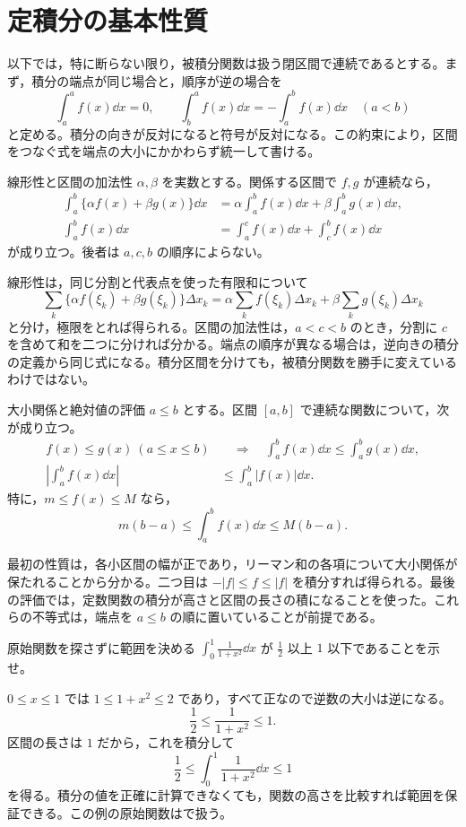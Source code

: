 \section{定積分の基本性質}\label{節:定積分性質}
以下では，特に断らない限り，被積分関数は扱う閉区間で連続であるとする。まず，積分の端点が同じ場合と，順序が逆の場合を
\[
 \int_a^a f(x)\dd x=0,\qquad
 \int_b^a f(x)\dd x=-\int_a^b f(x)\dd x\quad(a<b)
\]
と定める。積分の向きが反対になると符号が反対になる。この約束により，区間をつなぐ式を端点の大小にかかわらず統一して書ける。

\begin{theorem}{線形性と区間の加法性}\label{定理:積分基本性質}
$\alpha,\beta$ を実数とする。関係する区間で $f,g$ が連続なら，
\begin{align*}
 \int_a^b\{\alpha f(x)+\beta g(x)\}\dd x
 &=\alpha\int_a^b f(x)\dd x+\beta\int_a^b g(x)\dd x,\\
 \int_a^b f(x)\dd x
 &=\int_a^c f(x)\dd x+\int_c^b f(x)\dd x
\end{align*}
が成り立つ。後者は $a,c,b$ の順序によらない。
\end{theorem}

線形性は，同じ分割と代表点を使った有限和について
\[
 \sum_k\{\alpha f(\xi_k)+\beta g(\xi_k)\}\Delta x_k
 =\alpha\sum_k f(\xi_k)\Delta x_k
  +\beta\sum_k g(\xi_k)\Delta x_k
\]
と分け，極限をとれば得られる。区間の加法性は，$a<c<b$ のとき，分割に $c$ を含めて和を二つに分ければ分かる。端点の順序が異なる場合は，逆向きの積分の定義から同じ式になる。積分区間を分けても，被積分関数を勝手に変えているわけではない。

\begin{theorem}{大小関係と絶対値の評価}\label{定理:積分評価}
$a\le b$ とする。区間 $[a,b]$ で連続な関数について，次が成り立つ。
\begin{align*}
 f(x)\le g(x)\ (a\le x\le b)
 &\quad\Longrightarrow\quad
 \int_a^b f(x)\dd x\le\int_a^b g(x)\dd x,\\
 \left|\int_a^b f(x)\dd x\right|
 &\le\int_a^b|f(x)|\dd x.
\end{align*}
特に，$m\le f(x)\le M$ なら，
\[
 m(b-a)\le\int_a^b f(x)\dd x\le M(b-a).
\]
\end{theorem}

最初の性質は，各小区間の幅が正であり，リーマン和の各項について大小関係が保たれることから分かる。二つ目は $-|f|\le f\le|f|$ を積分すれば得られる。最後の評価では，定数関数の積分が高さと区間の長さの積になることを使った。これらの不等式は，端点を $a\le b$ の順に置いていることが前提である。

\begin{example}{原始関数を探さずに範囲を決める}
$\int_0^1\frac1{1+x^2}\dd x$ が $\frac12$ 以上 $1$ 以下であることを示せ。
\end{example}
$0\le x\le1$ では $1\le1+x^2\le2$ であり，すべて正なので逆数の大小は逆になる。
\[
 \frac12\le\frac1{1+x^2}\le1.
\]
区間の長さは $1$ だから，これを積分して
\[
 \frac12\le\int_0^1\frac1{1+x^2}\dd x\le1
\]
を得る。積分の値を正確に計算できなくても，関数の高さを比較すれば範囲を保証できる。この例の原始関数はで扱う。

%
